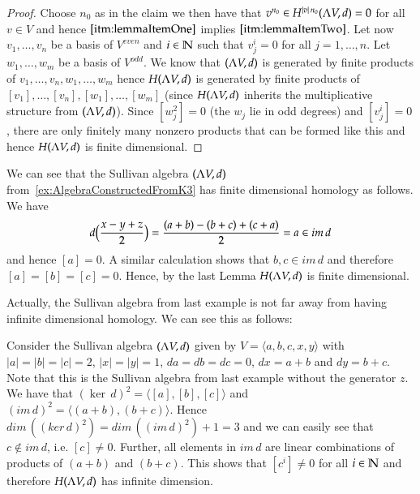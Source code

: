  \begin{proof}
  Choose $n_0$ as in the claim we then have that $v^{n_0} \in H^{|v| \, n_0} (\Lambda V,d) = 0$ for all $v \in V$ and hence 
  $\ref{itm:lemmaItemOne}$ implies $\ref{itm:lemmaItemTwo}$.
  Let now $v_1, \ldots, v_n$ be a basis of $V^{even}$ and $i \in \mathbb{N}$ such that $v_j^i = 0$ for all $j = 1, \ldots, n$. Let
  $w_1, \ldots, w_m$ be a basis of $V^{odd}$. We know that $(\Lambda V,d)$ is generated by finite products
  of $v_1, \ldots, v_n, w_1, \ldots, w_m$  hence  $H (\Lambda V,d) $ is generated by finite 
  products of $[v_1], \ldots, [v_n], [w_1], \ldots, [w_m]$ (since $H (\Lambda V,d) $ inherits the multiplicative structure from
  $(\Lambda V,d)$). Since $[w_j^2] = 0$ (the $w_j$ lie in odd degrees) and $[v_j^i] = 0$, there are only finitely
  many nonzero products that can be formed like this and hence $H (\Lambda V,d)$ is finite dimensional.
 \end{proof}

 \begin{Example}
\label{ex:AlgebraConstructedFromK3HasFiniteHomology}
 We can see that the Sullivan algebra $(\Lambda V,d)$ from~\ref{ex:AlgebraConstructedFromK3} has finite dimensional homology
 as follows. 
 We have 
 $$d \big{(} \frac{x - y + z}{2} \big{)} = \frac{(a + b) - (b + c) + (c + a)}{2} = a \in im \, d$$
 and hence $[a] = 0$. A similar calculation shows that $b,c \in im \, d$ and therefore
 $[a] = [b] = [c] = 0$. Hence, by the last Lemma $H (\Lambda V,d)$ is finite dimensional.
 \end{Example}

 Actually, the Sullivan algebra from last example is not far away from having infinite dimensional homology.
 We can see this as follows:
 
 \begin{Example}
\label{ex:AlgebraFromK3WithoutOneEdge}
  Consider the Sullivan algebra $(\Lambda V,d)$ given by $V = \langle a,b,c , x,y \rangle$ with 
  $|a| = |b| = |c| = 2$, $|x| = |y| = 1$, $da = db = dc = 0$, $dx = a + b$ and $dy = b + c$.
  Note that this is the Sullivan algebra from last example without the generator $z$.
	 We have that ${(\ker \, d)}^2 = \langle [a], [b], [c] \rangle$ and 
  $(im \, d)^2 = \langle (a + b), (b +c) \rangle$. Hence $dim \, ( (ker \, d)^2 ) = dim \, ((im \, d)^2 )+ 1 = 3$ and 
  we can easily see that $c \notin im \,d$, i.e. $[c] \neq 0$. Further, all elements in $im \, d$ are 
  linear combinations of products of $( a + b)$ and $(b +c)$. This shows that $[c^i] \neq 0$ for all $i \in \mathbb{N}$
  and therefore $H (\Lambda V,d)$ has infinite dimension. 
 \end{Example}


